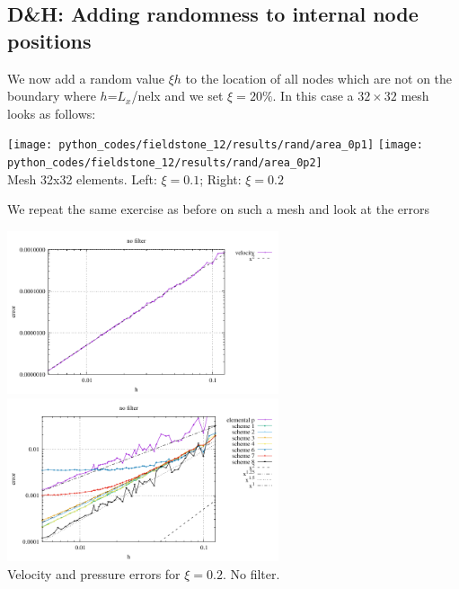 \newpage
\subsection*{D\&H: Adding randomness to internal node positions} We now add a random value $\xi h$ to the 
location of all nodes which are not on the boundary where $h$=$L_x$/nelx and we set $\xi=20\%$.
In this case a $32\times 32$ mesh looks as follows:

\begin{center}
\texttt{[image: python\_codes/fieldstone\_12/results/rand/area\_0p1]}
\texttt{[image: python\_codes/fieldstone\_12/results/rand/area\_0p2]}\\
{\captionfont Mesh 32x32 elements. Left: $\xi=0.1$; Right: $\xi=0.2$}
\end{center}

We repeat the same exercise as before on such a mesh and look at the errors

\begin{center}
\includegraphics[width=8cm]{python_codes/fieldstone_12/results/rand/errorsV_nofilter}
\includegraphics[width=8cm]{python_codes/fieldstone_12/results/rand/errorsP_nofilter}\\
{\captionfont Velocity and pressure errors for $\xi=0.2$. No filter.}
\end{center} 


